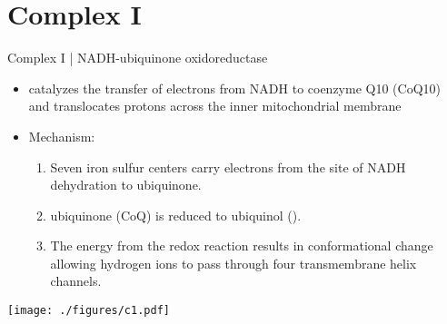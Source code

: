 \documentclass[presentation, smaller]{beamer}
\begin{document}
\section{Complex I}
\label{sec:org4eb6ccc}
\begin{frame}[label={sec:org4c622b3}]{Complex I | NADH-ubiquinone oxidoreductase}
\begin{itemize}
\item catalyzes the transfer of electrons from NADH to coenzyme Q10
(CoQ10) and translocates protons across the inner mitochondrial
membrane

\item Mechanism: 
\begin{enumerate}
\item Seven iron sulfur centers carry electrons from the site of NADH
dehydration to ubiquinone.

\item ubiquinone (CoQ) is reduced to ubiquinol ().

\item The energy from the redox reaction results in conformational
change allowing hydrogen ions to pass through four transmembrane
helix channels.
\end{enumerate}
\end{itemize}

\begin{center}
\texttt{[image: ./figures/c1.pdf]}
\end{center}
\end{frame}
\end{document}
